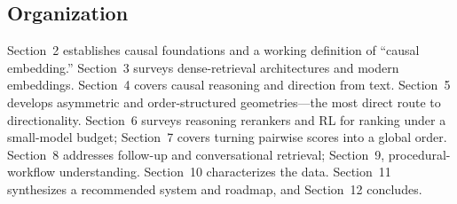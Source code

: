 \subsection{Organization}
Section~2 establishes causal foundations and a working definition of ``causal
embedding.'' Section~3 surveys dense-retrieval architectures and modern embeddings.
Section~4 covers causal reasoning and direction from text. Section~5 develops asymmetric
and order-structured geometries---the most direct route to directionality. Section~6
surveys reasoning rerankers and RL for ranking under a small-model budget; Section~7
covers turning pairwise scores into a global order. Section~8 addresses follow-up and
conversational retrieval; Section~9, procedural-workflow understanding. Section~10
characterizes the data. Section~11 synthesizes a recommended system and roadmap, and
Section~12 concludes.

